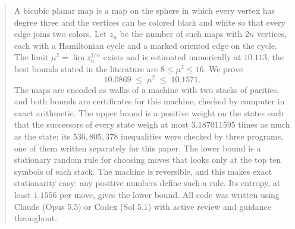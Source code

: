 \begin{abstract}
A bicubic planar map is a map on the sphere in which every vertex has degree three and the vertices can be colored
black and white so that every edge joins two colors. Let $z_n$ be the number of such maps with $2n$ vertices, each
with a Hamiltonian cycle and a marked oriented edge on the cycle. The limit $\mu^2=\lim z_n^{1/n}$ exists and is
estimated numerically at $10.113$; the best bounds stated in the literature are $8\le\mu^2\le16$. We prove
\[ 10.0869\;\le\;\mu^2\;\le\;10.1571 . \]
The maps are encoded as walks of a machine with two stacks of parities, and both bounds are certificates for this
machine, checked by computer in exact arithmetic. The upper bound is a positive weight on the states such that the
successors of every state weigh at most $3.187011595$ times as much as the state; its $536{,}805{,}378$ inequalities
were checked by three programs, one of them written separately for this paper. The lower bound is a stationary random rule for choosing moves that
looks only at the top ten symbols of each stack. The machine is reversible, and this makes exact stationarity
easy: any positive numbers define such a rule. Its entropy, at least $1.1556$ per move, gives the lower bound.
All code was written using Claude (Opus 5.5) or Codex (Sol 5.1) with active review and guidance throughout.
\end{abstract}
